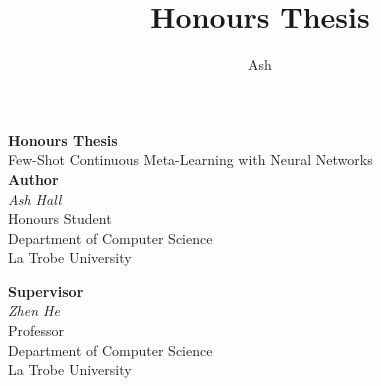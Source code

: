 \documentclass{report}
\title{Honours Thesis}
\author{Ash}
\begin{document}
\begin{titlepage}
 \begin{center}
  \vspace*{5cm}
  {\huge \textbf{Honours Thesis}} \\
  \vspace{0.3cm}
  {\large Few-Shot Continuous Meta-Learning with Neural Networks} \\
  \vspace*{2cm}
  \textbf{Author} \\
  \textit{Ash Hall} \\
  Honours Student \\
  Department of Computer Science \\
  La Trobe University \\
  \vspace{0.75cm}

  \textbf{Supervisor} \\
  \textit{Zhen He} \\
  Professor \\
  Department of Computer Science \\
  La Trobe University \\


  \vfill
 \end{center}
\end{titlepage}
\thispagestyle{empty}
\newpage
\thispagestyle{empty}
\tableofcontents
\newpage
\thispagestyle{empty}
\listoffigures
\newpage
\end{document}
